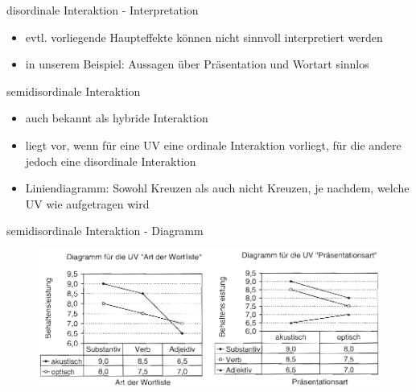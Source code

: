 \documentclass{beamer}
\begin{document}
	\begin{frame}{disordinale Interaktion - Interpretation}
		\begin{itemize}
			\item evtl. vorliegende Haupteffekte können nicht sinnvoll interpretiert werden
			\item in unserem Beispiel: Aussagen über Präsentation und Wortart sinnlos
		\end{itemize}
	\end{frame}
	
	\begin{frame}{semidisordinale Interaktion} 
		\begin{itemize}
			\item auch bekannt als hybride Interaktion
			\item liegt vor, wenn für eine UV eine ordinale Interaktion vorliegt, für die andere jedoch eine disordinale Interaktion
			\item Liniendiagramm: Sowohl Kreuzen als auch nicht Kreuzen, je nachdem, welche UV wie aufgetragen wird
		\end{itemize}
	\end{frame}
	
	\begin{frame}{semidisordinale Interaktion - Diagramm}
		\begin{figure}
			\centering
			\includegraphics[width=1.0\textwidth]{Bilder/semidisordinaleI.png}
		\end{figure}
	\end{frame}
	
\end{document}
